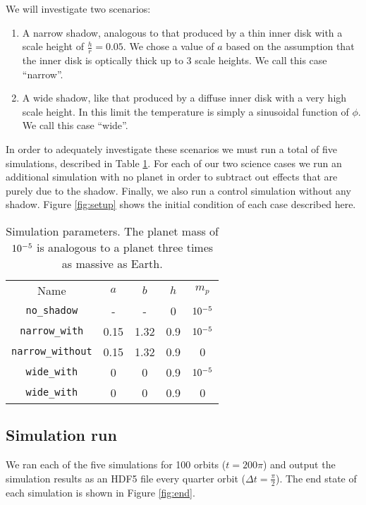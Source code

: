 \documentclass[twocolumn]{aastex631}
\begin{document}
We will investigate two scenarios:
\begin{enumerate}
    \item A narrow shadow, analogous to that produced by a thin inner disk with a scale height of $\frac{h}{r} = 0.05$. We chose a value of $a$ based on the assumption that the inner disk
        is optically thick up to 3 scale heights. We call this case ``narrow''.
    \item A wide shadow, like that produced by a diffuse inner disk with a very high scale height. In this limit the temperature is simply a sinusoidal function of $\phi$. We call this case ``wide''.
\end{enumerate}
In order to adequately investigate these scenarios we must run a total of five simulations, described in Table \ref{tab:scenarios}. For each of our two science cases we run an
additional simulation with no planet in order to subtract out effects that are purely due to the shadow. Finally, we also run a control simulation without any shadow.
Figure \ref{fig:setup} shows the initial condition of each case described here.


\begin{table}
    \begin{tabular}{ccccc}
        \hline
        \hline
        Name & $a$ & $b$ & $h$ & $m_p$ \\
        \texttt{no\_shadow} & - & - & 0 & $10^{-5}$ \\
        \texttt{narrow\_with} & 0.15 & 1.32 & 0.9 & $10^{-5}$ \\
        \texttt{narrow\_without} & 0.15 & 1.32 & 0.9 & 0 \\
        \texttt{wide\_with} & 0 & 0 & 0.9 & $10^{-5}$ \\
        \texttt{wide\_with} & 0 & 0 & 0.9 & 0 \\
        \hline
    \end{tabular}
    \caption{Simulation parameters. The planet mass of $10^{-5}$ is analogous to a planet three times as massive as Earth.}
    \label{tab:scenarios}
\end{table}

\subsection{Simulation run}
\label{subsec:sim_run}

We ran each of the five simulations for 100 orbits ($t = 200\pi$) and output the simulation results as an HDF5 file every
quarter orbit ($\Delta t = \frac{\pi}{2}$). The end state of each simulation is shown in Figure \ref{fig:end}.
\end{document}
